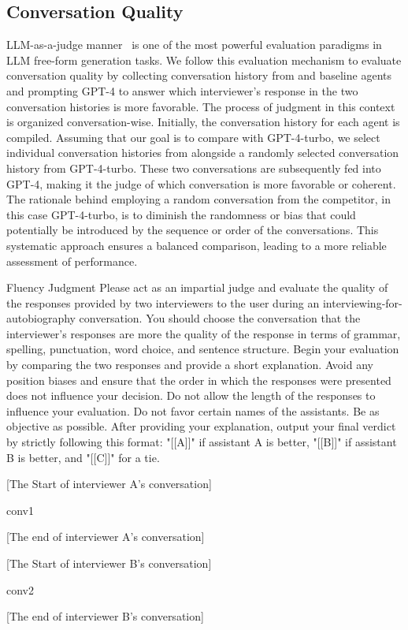 \subsection{Conversation Quality}\label{appendix:conv_eval}
LLM-as-a-judge manner~\cite{zheng2024judging} is one of the most powerful evaluation paradigms in LLM free-form generation tasks. We follow this evaluation mechanism to evaluate conversation quality by collecting conversation history from \methodname and baseline agents and prompting GPT-4 to answer which interviewer's response in the two conversation histories is more favorable. The process of judgment in this context is organized conversation-wise. Initially, the conversation history for each agent is compiled. Assuming that our goal is to compare \methodname with GPT-4-turbo, we select individual conversation histories from \methodname alongside a randomly selected conversation history from GPT-4-turbo. These two conversations are subsequently fed into GPT-4, making it the judge of which conversation is more favorable or coherent. The rationale behind employing a random conversation from the competitor, in this case GPT-4-turbo, is to diminish the randomness or bias that could potentially be introduced by the sequence or order of the conversations. This systematic approach ensures a balanced comparison, leading to a more reliable assessment of performance.

\begin{mybox}{Fluency Judgment}
Please act as an impartial judge and evaluate the quality of the responses provided by two interviewers to the user during an interviewing-for-autobiography conversation. 
You should choose the conversation that the interviewer's responses are more the quality of the response in terms of grammar, spelling, punctuation, word choice, and sentence structure.
Begin your evaluation by comparing the two responses and provide a short explanation. Avoid any position biases and ensure that the order in which the responses were presented does not influence your decision. 
Do not allow the length of the responses to influence your evaluation. Do not favor certain names of the assistants. Be as objective as possible. After providing your explanation, output your
final verdict by strictly following this format: "[[A]]" if assistant A is better, "[[B]]" if assistant B is better, and "[[C]]" for a tie.

[The Start of interviewer A’s conversation]

{conv1}

[The end of interviewer A’s conversation]


[The Start of interviewer B’s conversation]

{conv2}

[The end of interviewer B’s conversation]


\end{mybox}

